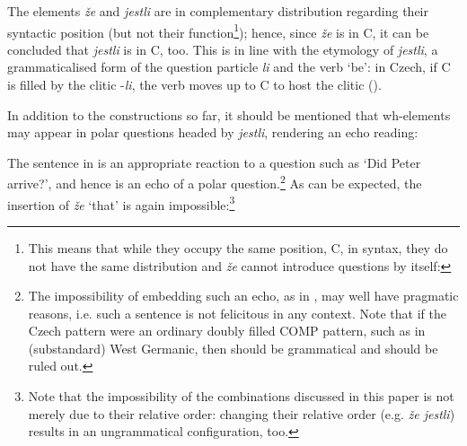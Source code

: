 \documentclass[output=paper,
modfonts, hidelinks, newtxmath
]{langscibook}
\begin{document}
\noindent The elements \textit{že} and \textit{jestli} are in complementary distribution regarding their syntactic position (but not their function\footnote{This means that while they occupy the same position, C, in syntax, they do not have the same distribution and \textit{že} cannot introduce questions by itself:

\z 

}); hence, since \textit{že} is in C, it can be concluded that \textit{jestli} is in C, too. This is in line with the etymology of \textit{jestli}, a grammaticalised form of the question particle \textit{li} and the verb `be': in Czech, if C is filled by the clitic -\textit{li}, the verb moves up to C to host the clitic (\citealt{schwabe2004}).

In addition to the constructions so far, it should be mentioned that wh-elements may appear in polar questions headed by \textit{jestli}, rendering an echo reading:

\ea
	\z 
\z 

\noindent The sentence in  is an appropriate reaction to a question such as `Did Peter arrive?', and hence is an echo of a polar question.\footnote{The impossibility of embedding such an echo, as in , may well have pragmatic reasons, i.e. such a sentence is not felicitous in any context. Note that if the Czech pattern were an ordinary doubly filled COMP pattern, such as in (substandard) West Germanic, then  should be grammatical and  should be ruled out.} As can be expected, the insertion of \textit{že} `that' is again impossible:\footnote{Note that the impossibility of the combinations discussed in this paper is not merely due to their relative order: changing their relative order (e.g. \textit{že jestli}) results in an ungrammatical configuration, too.}
\end{document}
